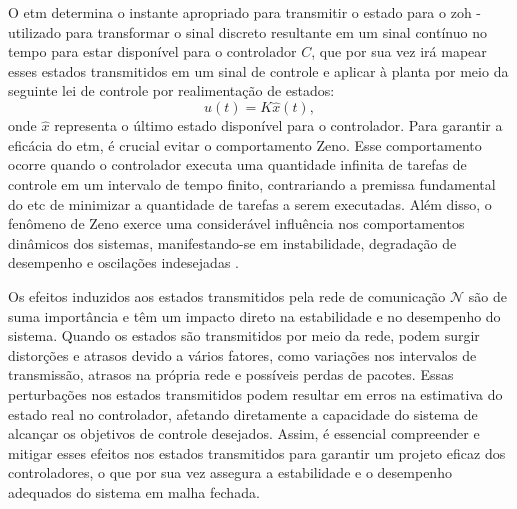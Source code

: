 O \acrshort{etm} determina o instante apropriado para transmitir o estado para o \acrfull{zoh} - utilizado para transformar o sinal discreto resultante em um sinal contínuo no tempo para estar disponível para o controlador $C$, que por sua vez irá mapear esses estados transmitidos em um sinal de controle e aplicar à planta por meio da seguinte lei de controle por realimentação de estados: \begin{equation}u(t) = K \hat{x}(t),\end{equation} onde $\hat{x}$ representa o último estado disponível para o controlador. Para garantir a eficácia do \acrshort{etm}, é crucial evitar o comportamento Zeno. Esse comportamento ocorre quando o controlador executa uma quantidade infinita de tarefas de controle em um intervalo de tempo finito, contrariando a premissa fundamental do \acrshort{etc} de minimizar a quantidade de tarefas a serem executadas. Além disso, o fenômeno de Zeno exerce uma considerável influência nos comportamentos dinâmicos dos sistemas, manifestando-se em instabilidade, degradação de desempenho e oscilações indesejadas \citep{Yang2024}.

Os efeitos induzidos aos estados transmitidos pela rede de comunicação $\mathcal{N}$ são de suma importância e têm um impacto direto na estabilidade e no desempenho do sistema. Quando os estados são transmitidos por meio da rede, podem surgir distorções e atrasos devido a vários fatores, como variações nos intervalos de transmissão, atrasos na própria rede e possíveis perdas de pacotes. Essas perturbações nos estados transmitidos podem resultar em erros na estimativa do estado real no controlador, afetando diretamente a capacidade do sistema de alcançar os objetivos de controle desejados. Assim, é essencial compreender e mitigar esses efeitos nos estados transmitidos para garantir um projeto eficaz dos controladores, o que por sua vez assegura a estabilidade e o desempenho adequados do sistema em malha fechada.


